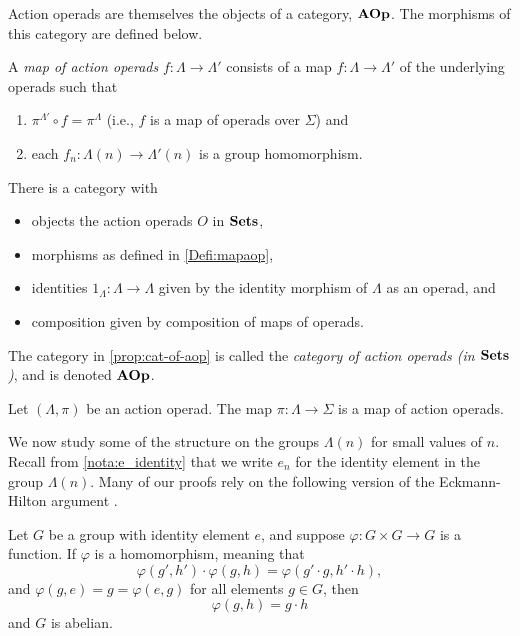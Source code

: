 Action operads are themselves the objects of a category, $\mathbf{AOp}$. The morphisms of this category are defined below.
\begin{Defi}\label{Defi:mapaop}
A \textit{map of action operads} $f \colon  \Lambda \rightarrow \Lambda'$ consists of a map $f \colon \Lambda \rightarrow \Lambda'$ of the underlying operads such that
  \begin{enumerate}
    \item $\pi^{\Lambda'} \circ f = \pi^{\Lambda}$ (i.e., $f$ is a map of operads over $\Sigma$) and
    \item each $f_{n} \colon \Lambda(n) \rightarrow \Lambda'(n)$ is a group homomorphism.
  \end{enumerate}
\end{Defi}

\begin{prop}\label{prop:cat-of-aop}
There is a category with 
\begin{itemize}
\item objects the action operads $O$ in $\mathbf{Sets}$, 
\item morphisms as defined in \cref{Defi:mapaop},
\item identities $1_\Lambda \colon \Lambda \to \Lambda$ given by the identity morphism of $\Lambda$ as an operad,
and
\item composition given by composition of maps of operads.
\end{itemize}
\end{prop}

\begin{nota}\label{nota:cat_aop}
The category in \cref{prop:cat-of-aop} is called the \emph{category of action operads (in $\mathbf{Sets}$)}, and is denoted $\mathbf{AOp}$.
\end{nota}

\begin{prop}\label{prop:pi-in-aop}
Let $(\Lambda, \pi)$ be an action operad. The map $\pi \colon \Lambda \rightarrow \Sigma$ is a map of action operads.
\end{prop}


We now study some of the structure on the groups $\Lambda(n)$ for small values of $n$. Recall from \cref{nota:e_identity} that we write $e_{n}$ for the identity element in the group $\Lambda(n)$.
Many of our proofs rely on the following version of the Eckmann-Hilton argument \cite{eh}.

\begin{prop}\label{prop:EH}
Let $G$ be a group with identity element $e$, and suppose $\varphi \colon G \times G \to G$ is a function. If $\varphi$ is a homomorphism, meaning that
\[
\varphi(g',h') \cdot \varphi(g,h) = \varphi(g' \cdot g, h' \cdot h),
\]
and $\varphi(g,e) = g = \varphi(e,g)$ for all elements $g \in G$, then 
\[
\varphi(g, h) = g \cdot h
\]
and $G$ is abelian.
\end{prop}

